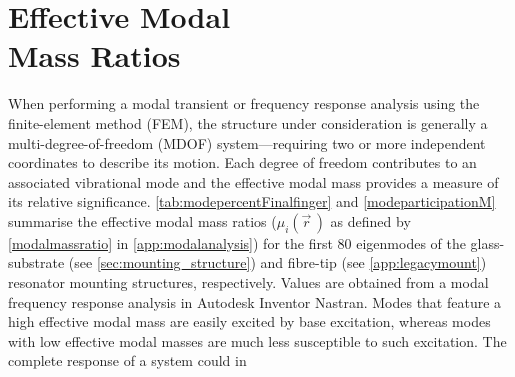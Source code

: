 \documentclass[../Thesis-IJspeert.tex]{subfiles}
\begin{document}
\chapter[Effective Modal Mass Ratios]{Effective Modal\\Mass Ratios}
\label{app:effectivemodalmass}
\startsquarepar
When performing a modal transient or frequency response analysis using the finite-element method (FEM), the structure under consideration is generally a multi-degree-of-freedom (MDOF) system---requiring two or more independent coordinates to describe its motion. Each degree of freedom contributes to an associated vibrational mode and the effective modal mass provides a measure of its relative significance. \autoref{tab:modepercentFinalfinger} and \autoref{modeparticipationM} summarise the effective modal mass ratios ($\mu_i(\vec{r}\,)$ as defined by \autoref{modalmassratio} in \autoref{app:modalanalysis}) for the first \num{80} eigenmodes of the glass-substrate (see \autoref{sec:mounting_structure}) and fibre-tip (see \autoref{app:legacymount}) resonator mounting structures, respectively. Values are obtained from a modal frequency response analysis in Autodesk Inventor Nastran. Modes that feature a high effective modal mass are easily excited by base excitation, whereas modes with low effective modal masses are much less susceptible to such excitation. The complete response of a system could in
\stopsquarepar
\end{document}
